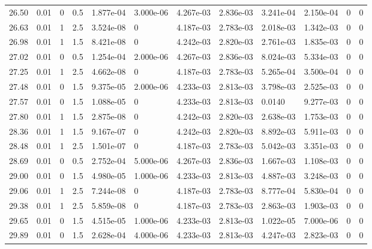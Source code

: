 \documentclass[preview]{standalone}
\begin{document}
{{{{\begin{tabular}{L{1.2cm}C{1.2cm} C{0.3cm}C{0.5cm} C{1.4cm}C{1.4cm} C{1.4cm}C{1.4cm} C{1.6cm}C{1.6cm} C{1.6cm}C{1.6cm}}
  26.50  &  0.01  & 0     & 0.5 &  1.877e-04  & 3.000e-06  &  4.267e-03&   2.836e-03& 3.241e-04 & 2.150e-04   &  0 & 0  \\ 
  26.63  &  0.01  & 1     & 2.5 &  3.524e-08  & 0  &  4.187e-03&   2.783e-03& 2.018e-03 & 1.342e-03   &  0 & 0  \\ 
  26.98  &  0.01  & 1     & 1.5 &  8.421e-08  & 0  &  4.242e-03&   2.820e-03& 2.761e-03 & 1.835e-03   &  0 & 0  \\ 
  27.02  &  0.01  & 0     & 0.5 &  1.254e-04  & 2.000e-06  &  4.267e-03&   2.836e-03& 8.024e-03 & 5.334e-03   &  0 & 0  \\ 
  27.25  &  0.01  & 1     & 2.5 &  4.662e-08  & 0  &  4.187e-03&   2.783e-03& 5.265e-04 & 3.500e-04   &  0 & 0  \\ 
  27.48  &  0.01  & 0     & 1.5 &  9.375e-05  & 2.000e-06  &  4.233e-03&   2.813e-03& 3.798e-03 & 2.525e-03   &  0 & 0  \\ 
  27.57  &  0.01  & 0     & 1.5 &  1.088e-05  & 0  &  4.233e-03&   2.813e-03& 0.0140 & 9.277e-03   &  0 & 0  \\ 
  27.80  &  0.01  & 1     & 1.5 &  2.875e-08  & 0  &  4.242e-03&   2.820e-03& 2.638e-03 & 1.753e-03   &  0 & 0  \\ 
  28.36  &  0.01  & 1     & 1.5 &  9.167e-07  & 0  &  4.242e-03&   2.820e-03& 8.892e-03 & 5.911e-03   &  0 & 0  \\ 
  28.48  &  0.01  & 1     & 2.5 &  1.501e-07  & 0  &  4.187e-03&   2.783e-03& 5.042e-03 & 3.351e-03   &  0 & 0  \\ 
  28.69  &  0.01  & 0     & 0.5 &  2.752e-04  & 5.000e-06  &  4.267e-03&   2.836e-03& 1.667e-03 & 1.108e-03   &  0 & 0  \\ 
  29.00  &  0.01  & 0     & 1.5 &  4.980e-05  & 1.000e-06  &  4.233e-03&   2.813e-03& 4.887e-03 & 3.248e-03   &  0 & 0  \\ 
  29.06  &  0.01  & 1     & 2.5 &  7.244e-08  & 0  &  4.187e-03&   2.783e-03& 8.777e-04 & 5.830e-04   &  0 & 0  \\ 
  29.38  &  0.01  & 1     & 2.5 &  5.859e-08  & 0  &  4.187e-03&   2.783e-03& 2.863e-03 & 1.903e-03   &  0 & 0  \\ 
  29.65  &  0.01  & 0     & 1.5 &  4.515e-05  & 1.000e-06  &  4.233e-03&   2.813e-03& 1.022e-05 & 7.000e-06   &  0 & 0  \\ 
  29.89  &  0.01  & 0     & 1.5 &  2.628e-04  & 4.000e-06  &  4.233e-03&   2.813e-03& 4.247e-03 & 2.823e-03   &  0 & 0  \\ 
\hline 
\end{tabular} 

}}}}
\end{document}
